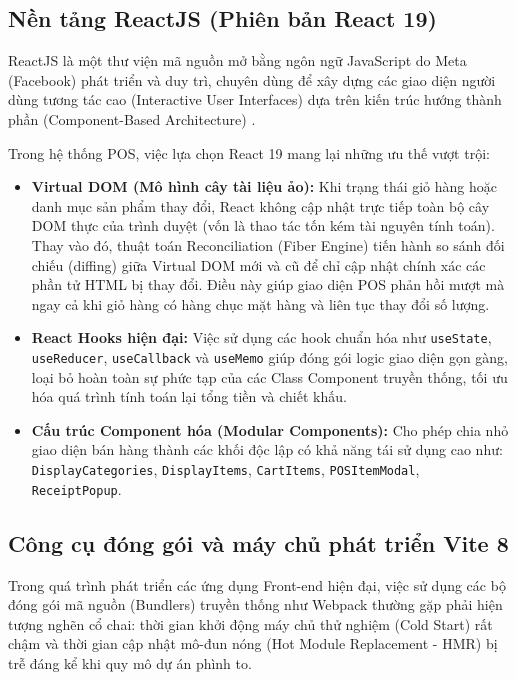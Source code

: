 \subsection{Nền tảng ReactJS (Phiên bản React 19)}
ReactJS là một thư viện mã nguồn mở bằng ngôn ngữ JavaScript do Meta (Facebook) phát triển và duy trì, chuyên dùng để xây dựng các giao diện người dùng tương tác cao (Interactive User Interfaces) dựa trên kiến trúc hướng thành phần (Component-Based Architecture) \cite{banks2020}. 

Trong hệ thống POS, việc lựa chọn React 19 mang lại những ưu thế vượt trội:
\begin{itemize}[leftmargin=1.5cm]
    \item \textbf{Virtual DOM (Mô hình cây tài liệu ảo):} Khi trạng thái giỏ hàng hoặc danh mục sản phẩm thay đổi, React không cập nhật trực tiếp toàn bộ cây DOM thực của trình duyệt (vốn là thao tác tốn kém tài nguyên tính toán). Thay vào đó, thuật toán Reconciliation (Fiber Engine) tiến hành so sánh đối chiếu (diffing) giữa Virtual DOM mới và cũ để chỉ cập nhật chính xác các phần tử HTML bị thay đổi. Điều này giúp giao diện POS phản hồi mượt mà ngay cả khi giỏ hàng có hàng chục mặt hàng và liên tục thay đổi số lượng.
    \item \textbf{React Hooks hiện đại:} Việc sử dụng các hook chuẩn hóa như \texttt{useState}, \texttt{useReducer}, \texttt{useCallback} và \texttt{useMemo} giúp đóng gói logic giao diện gọn gàng, loại bỏ hoàn toàn sự phức tạp của các Class Component truyền thống, tối ưu hóa quá trình tính toán lại tổng tiền và chiết khấu.
    \item \textbf{Cấu trúc Component hóa (Modular Components):} Cho phép chia nhỏ giao diện bán hàng thành các khối độc lập có khả năng tái sử dụng cao như: \texttt{DisplayCategories}, \texttt{DisplayItems}, \texttt{CartItems}, \texttt{POSItemModal}, \texttt{ReceiptPopup}.
\end{itemize}

\subsection{Công cụ đóng gói và máy chủ phát triển Vite 8}
Trong quá trình phát triển các ứng dụng Front-end hiện đại, việc sử dụng các bộ đóng gói mã nguồn (Bundlers) truyền thống như Webpack thường gặp phải hiện tượng nghẽn cổ chai: thời gian khởi động máy chủ thử nghiệm (Cold Start) rất chậm và thời gian cập nhật mô-đun nóng (Hot Module Replacement - HMR) bị trễ đáng kể khi quy mô dự án phình to.

